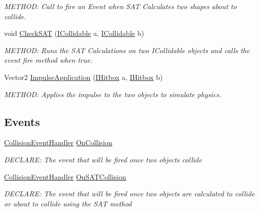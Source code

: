 \begin{DoxyCompactItemize}
\begin{DoxyCompactList}\small\item\em M\+E\+T\+H\+OD\+: Call to fire an Event when S\+AT Calculates two shapes about to collide. \end{DoxyCompactList}\item 
void \hyperlink{a00502_a18f0056903776f291a462fb4bbbfc224}{Check\+S\+AT} (\hyperlink{a00426}{I\+Collidable} a, \hyperlink{a00426}{I\+Collidable} b)
\begin{DoxyCompactList}\small\item\em M\+E\+T\+H\+OD\+: Runs the S\+AT Calculations on two I\+Collidable objects and calls the event fire method when true. \end{DoxyCompactList}\item 
Vector2 \hyperlink{a00502_a47c9b58bdaf1f773ea3932f8c574ae0b}{Impulse\+Application} (\hyperlink{a00434}{I\+Hitbox} a, \hyperlink{a00434}{I\+Hitbox} b)
\begin{DoxyCompactList}\small\item\em M\+E\+T\+H\+OD\+: Applies the impulse to the two objects to simulate physics. \end{DoxyCompactList}\end{DoxyCompactItemize}
\subsection*{Events}
\begin{DoxyCompactItemize}
\item 
\hyperlink{a00502_a7a0a94d84fd7588d01218d607e7b1d27}{Collision\+Event\+Handler} \hyperlink{a00502_a030c2301f7a7ec14a4d852f3f039b22a}{On\+Collision}
\begin{DoxyCompactList}\small\item\em D\+E\+C\+L\+A\+RE\+: The event that will be fired once two objects collide \end{DoxyCompactList}\item 
\hyperlink{a00502_a7a0a94d84fd7588d01218d607e7b1d27}{Collision\+Event\+Handler} \hyperlink{a00502_a4eb9637ff1544210696df98bae59b07e}{On\+S\+A\+T\+Collision}
\begin{DoxyCompactList}\small\item\em D\+E\+C\+L\+A\+RE\+: The event that will be fired once two objects are calculated to collide or about to collide using the S\+AT method \end{DoxyCompactList}\end{DoxyCompactItemize}


